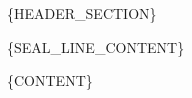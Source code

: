 \documentclass{article}
\begin{document}
\{HEADER_SECTION\}

\{SEAL_LINE_CONTENT\}

\vspace{1cm}

\{CONTENT\}
\end{document}
